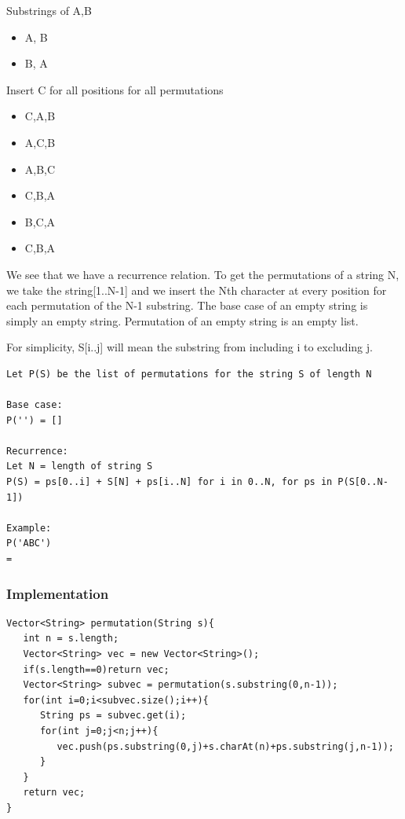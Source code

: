 \documentclass[11pt,oneside]{book}
\begin{document}
Substrings of A,B

\begin{itemize}
\item A, B
\item B, A
\end{itemize}

Insert C for all positions for all permutations

\begin{itemize}
\item C,A,B
\item A,C,B
\item A,B,C
\item C,B,A
\item B,C,A
\item C,B,A
\end{itemize}

We see that we have a recurrence relation. To get the permutations of a string N, we take the string[1..N-1] and we insert the Nth character at every position for each permutation of the N-1 substring. The base case of an empty string is simply an empty string. Permutation of an empty string is an empty list.

For simplicity, S[i..j] will mean the substring from including i to excluding j.

\begin{lstlisting}
Let P(S) be the list of permutations for the string S of length N

Base case:
P('') = []

Recurrence:
Let N = length of string S
P(S) = ps[0..i] + S[N] + ps[i..N] for i in 0..N, for ps in P(S[0..N-1])

Example:
P('ABC')
=

\end{lstlisting}

\subsubsection{Implementation}

\begin{lstlisting}
Vector<String> permutation(String s){
   int n = s.length;
   Vector<String> vec = new Vector<String>();
   if(s.length==0)return vec;
   Vector<String> subvec = permutation(s.substring(0,n-1));
   for(int i=0;i<subvec.size();i++){
      String ps = subvec.get(i);
      for(int j=0;j<n;j++){
         vec.push(ps.substring(0,j)+s.charAt(n)+ps.substring(j,n-1));
      }
   }
   return vec;
}
\end{lstlisting}
\end{document}
